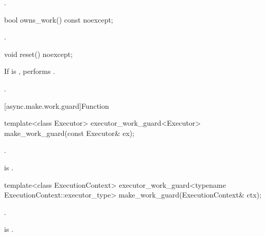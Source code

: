 \begin{itemdescr}
\pnum
\returns {}.
\end{itemdescr}

%
\begin{itemdecl}
bool owns_work() const noexcept;
\end{itemdecl}

\begin{itemdescr}
\pnum
\returns {}.
\end{itemdescr}

%
\begin{itemdecl}
void reset() noexcept;
\end{itemdecl}

\begin{itemdescr}
\pnum
\effects If  is , performs .

\pnum
\postconditions {}.
\end{itemdescr}




[async.make.work.guard]{Function }

%
\begin{itemdecl}
template<class Executor>
  executor_work_guard<Executor>
    make_work_guard(const Executor& ex);
\end{itemdecl}

\begin{itemdescr}
\pnum
\returns {}.

\pnum
{}
 is .
\end{itemdescr}

%
\begin{itemdecl}
template<class ExecutionContext>
  executor_work_guard<typename ExecutionContext::executor_type>
    make_work_guard(ExecutionContext& ctx);
\end{itemdecl}

\begin{itemdescr}
\pnum
\returns {}.

\pnum
{}
 is .
\end{itemdescr}


